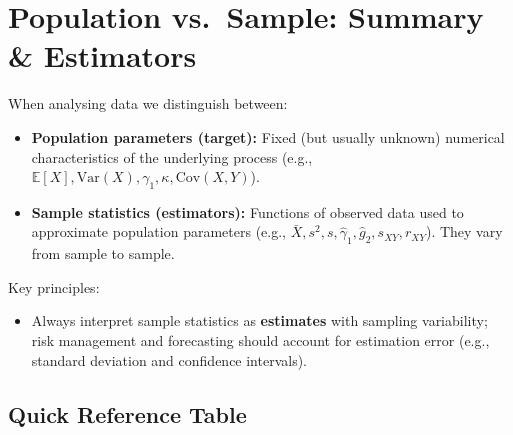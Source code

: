 \documentclass[
  12pt,
  letterpaper,
]{scrbook}
\providecommand{\tightlist}{%
  \setlength{\itemsep}{0pt}\setlength{\parskip}{0pt}}
\renewcommand{\tightlist}{\setlength{\itemsep}{0.5\baselineskip}\setlength{\parskip}{0.2\baselineskip}}
\theoremstyle{plain}
\theoremstyle{definition}
\theoremstyle{remark}
\begin{document}
\section{Population vs.~Sample: Summary \&
Estimators}\label{population-vs.-sample-summary-estimators}

When analysing data we distinguish between:

\begin{itemize}
\tightlist
\item
  \textbf{Population parameters (target):} Fixed (but usually unknown)
  numerical characteristics of the underlying process (e.g.,
  \(\mathbb{E}[X], \text{Var}(X), \gamma_1, \kappa, \text{Cov}(X,Y)\)).
\item
  \textbf{Sample statistics (estimators):} Functions of observed data
  used to approximate population parameters (e.g.,
  \(\bar{X}, s^2, s, \hat{\gamma}_1, \hat{g}_2, s_{XY}, r_{XY}\)). They
  vary from sample to sample.
\end{itemize}

Key principles:

\begin{itemize}
\tightlist
\item
  Always interpret sample statistics as \textbf{estimates} with sampling
  variability; risk management and forecasting should account for
  estimation error (e.g., standard deviation and confidence intervals).
\end{itemize}

\subsection{Quick Reference Table}\label{quick-reference-table}
\end{document}
